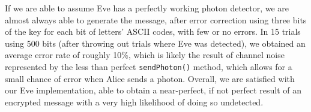 \documentclass{article}
\begin{document}
If we are able to assume Eve has a perfectly working photon detector, we are almost always able to generate the message, after error correction using three bits of the key for each bit of letters' ASCII codes, with few or no errors. In 15 trials using 500 bits (after throwing out trials where Eve was detected), we obtained an average error rate of roughly 10\%, which is likely the result of channel noise represented by the less than perfect \texttt{sendPhoton()} method, which allows for a small chance of error when Alice sends a photon. Overall, we are satisfied with our Eve implementation, able to obtain a near-perfect, if not perfect result of an encrypted message with a very high likelihood of doing so undetected.
\end{document}
